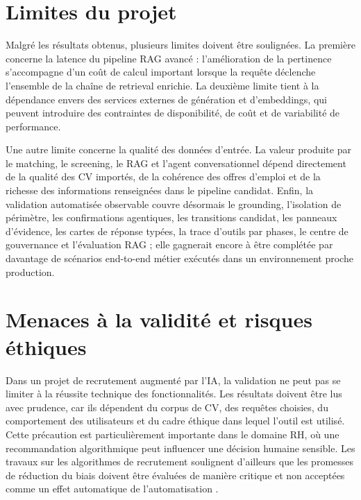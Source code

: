 \section*{Limites du projet}
Malgré les résultats obtenus, plusieurs limites doivent être soulignées. La première concerne la latence du pipeline RAG avancé : l'amélioration de la pertinence s'accompagne d'un coût de calcul important lorsque la requête déclenche l'ensemble de la chaîne de retrieval enrichie. La deuxième limite tient à la dépendance envers des services externes de génération et d'embeddings, qui peuvent introduire des contraintes de disponibilité, de coût et de variabilité de performance.

Une autre limite concerne la qualité des données d'entrée. La valeur produite par le matching, le screening, le RAG et l'agent conversationnel dépend directement de la qualité des CV importés, de la cohérence des offres d'emploi et de la richesse des informations renseignées dans le pipeline candidat. Enfin, la validation automatisée observable couvre désormais le grounding, l'isolation de périmètre, les confirmations agentiques, les transitions candidat, les panneaux d'évidence, les cartes de réponse typées, la trace d'outils par phases, le centre de gouvernance et l'évaluation RAG ; elle gagnerait encore à être complétée par davantage de scénarios end-to-end métier exécutés dans un environnement proche production.

\section*{Menaces à la validité et risques éthiques}
Dans un projet de recrutement augmenté par l'IA, la validation ne peut pas se limiter à la réussite technique des fonctionnalités. Les résultats doivent être lus avec prudence, car ils dépendent du corpus de CV, des requêtes choisies, du comportement des utilisateurs et du cadre éthique dans lequel l'outil est utilisé. Cette précaution est particulièrement importante dans le domaine RH, où une recommandation algorithmique peut influencer une décision humaine sensible. Les travaux sur les algorithmes de recrutement soulignent d'ailleurs que les promesses de réduction du biais doivent être évaluées de manière critique et non acceptées comme un effet automatique de l'automatisation .

